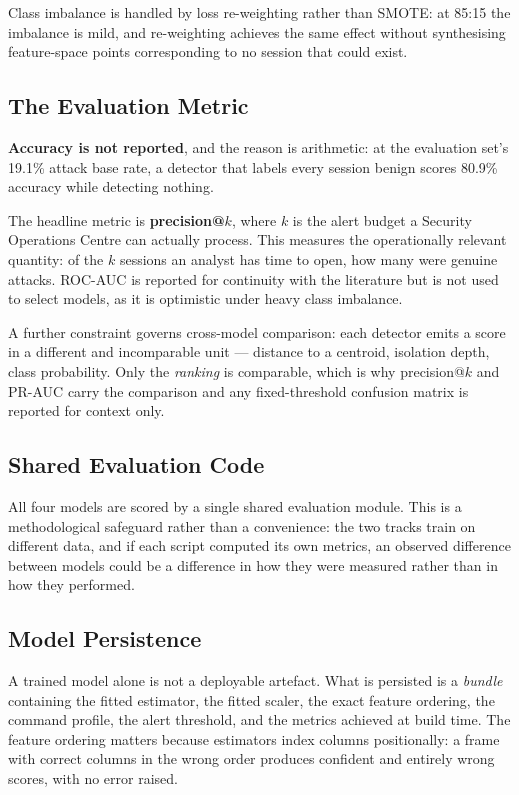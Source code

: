 \documentclass{classeENS}
\begin{document}
Class imbalance is handled by loss re-weighting rather than SMOTE: at 85:15 the imbalance is mild, and re-weighting achieves the same effect without synthesising feature-space points corresponding to no session that could exist.

\subsection{The Evaluation Metric}
\label{sec:metric}
\textbf{Accuracy is not reported}, and the reason is arithmetic: at the evaluation set's 19.1\% attack base rate, a detector that labels every session benign scores 80.9\% accuracy while detecting nothing.

The headline metric is \textbf{precision@$k$}, where $k$ is the alert budget a Security Operations Centre can actually process. This measures the operationally relevant quantity: of the $k$ sessions an analyst has time to open, how many were genuine attacks. ROC-AUC is reported for continuity with the literature but is not used to select models, as it is optimistic under heavy class imbalance.

A further constraint governs cross-model comparison: each detector emits a score in a different and incomparable unit --- distance to a centroid, isolation depth, class probability. Only the \emph{ranking} is comparable, which is why precision@$k$ and PR-AUC carry the comparison and any fixed-threshold confusion matrix is reported for context only.

\subsection{Shared Evaluation Code}
All four models are scored by a single shared evaluation module. This is a methodological safeguard rather than a convenience: the two tracks train on different data, and if each script computed its own metrics, an observed difference between models could be a difference in how they were measured rather than in how they performed.

\subsection{Model Persistence}
A trained model alone is not a deployable artefact. What is persisted is a \emph{bundle} containing the fitted estimator, the fitted scaler, the exact feature ordering, the command profile, the alert threshold, and the metrics achieved at build time. The feature ordering matters because estimators index columns positionally: a frame with correct columns in the wrong order produces confident and entirely wrong scores, with no error raised.
\end{document}
